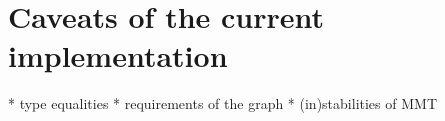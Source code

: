 \section{Caveats of the current implementation}
* type equalities
* requirements of the graph
* (in)stabilities of MMT
